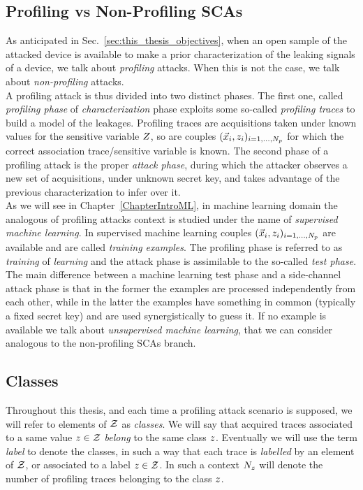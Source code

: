 \subsection{Profiling vs Non-Profiling SCAs}
As anticipated in Sec.~\ref{sec:this_thesis_objectives}, when an open sample of the attacked device is available to make a prior characterization of the leaking signals of a device, we talk about \emph{profiling} attacks. When this is not the case, we talk about \emph{non-profiling} attacks. \\
A profiling attack is thus divided into two distinct phases. The first one, called \emph{profiling phase} of \emph{characterization} phase exploits some so-called \emph{profiling traces} to build a model of the leakages. Profiling traces are acquisitions taken under known values for the sensitive variable $Z$, so are couples $(\vec{x}_i, z_i)_{i=1, \dots , N_p}$ for which the correct association trace/sensitive variable is known. The second phase of a profiling attack is the proper \emph{attack phase}, during which the attacker observes a new set of acquisitions, under unknown secret key, and takes advantage of the previous characterization to infer over it. \\
As we will see in Chapter~\ref{ChapterIntroML}, in machine learning domain the analogous of profiling attacks context is studied under the name of \emph{supervised machine learning}. In supervised machine learning couples $(\vec{x}_i, z_i)_{i=1, \dots , N_p}$ are available and are called \emph{training examples}. The profiling phase is referred to as \emph{training} of \emph{learning} and the attack phase is assimilable to the so-called \emph{test phase}. The main difference between a machine learning test phase and a side-channel attack phase is that in the former the examples are processed independently from each other, while in the latter the examples have something in common (typically a fixed secret key) and are used synergistically to guess it. If no example is available we talk about \emph{unsupervised machine learning}, that we can consider analogous to the non-profiling SCAs branch. 

\subsection{Classes}
Throughout this thesis, and each time a profiling attack scenario is supposed,  we will refer to elements of $\mathcal{Z}$ as \emph{classes}. We will say that acquired traces associated to a same value $z\in\mathcal{Z}$ \emph{belong} to the same class $z$. Eventually we will use the term \emph{label} to denote the classes, in such a way that each trace is \emph{labelled} by an element of $\mathcal{Z}$, or associated to a label $z\in\mathcal{Z}$. In such a context $N_{z}$ will denote the number of profiling traces belonging to the class $z$.

